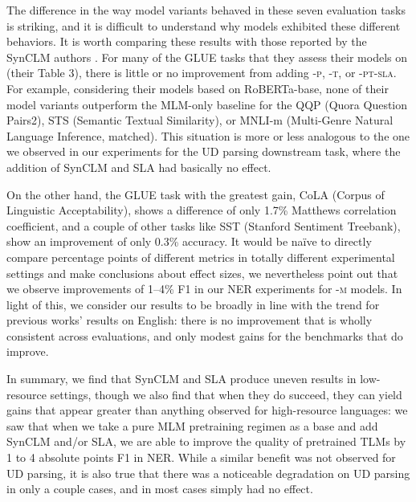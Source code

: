 \documentclass[11pt]{article}
\begin{document}
The difference in the way model variants behaved in these seven evaluation tasks is striking, and it is difficult to understand why models exhibited these different behaviors.
It is worth comparing these results with those reported by the SynCLM authors \citep{zhang-etal-2022-syntax}.
For many of the GLUE tasks that they assess their models on (their Table 3), there is little or no improvement from adding \textsc{-p}, \textsc{-t}, or \textsc{-pt-sla}.
For example, considering their models based on RoBERTa-base, none of their model variants outperform the MLM-only baseline for the QQP (Quora Question Pairs2), STS (Semantic Textual Similarity), or MNLI-m (Multi-Genre Natural Language Inference, matched).
This situation is more or less analogous to the one we observed in our experiments for the UD parsing downstream task, where the addition of SynCLM and SLA had basically no effect.

On the other hand, the GLUE task with the greatest gain, CoLA (Corpus of Linguistic Acceptability), shows a difference of only 1.7\% Matthews correlation coefficient, and a couple of other tasks like SST (Stanford Sentiment Treebank), show an improvement of only 0.3\% accuracy.
It would be na\"ive to directly compare percentage points of different metrics in totally different experimental settings and make conclusions about effect sizes, we nevertheless point out that we observe improvements of 1--4\% F1 in our NER experiments for \textsc{-m} models.
In light of this, we consider our results to be broadly in line with the trend for previous works' results on English: there is no improvement that is wholly consistent across evaluations, and only modest gains for the benchmarks that do improve.

In summary, we find that SynCLM and SLA produce uneven results in low-resource settings, though we also find that when they do succeed, they can yield gains that appear greater than anything observed for high-resource languages: we saw that when we take a pure MLM pretraining regimen as a base and add SynCLM and/or SLA, we are able to improve the quality of pretrained TLMs by 1 to 4 absolute points F1 in NER.
While a similar benefit was not observed for UD parsing, it is also true that there was a noticeable degradation on UD parsing in only a couple cases, and in most cases simply had no effect.
\end{document}
